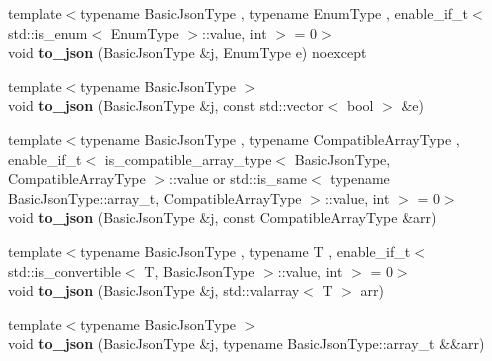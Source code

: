 \begin{DoxyCompactItemize}
\item 
\mbox{\label{namespacenlohmann_1_1detail_a0c8b159dba71981d6c555d284cf6e2bf}} 
{\footnotesize template$<$typename Basic\+Json\+Type , typename Enum\+Type , enable\+\_\+if\+\_\+t$<$ std\+::is\+\_\+enum$<$ Enum\+Type $>$\+::value, int $>$  = 0$>$ }\\void {\bfseries to\+\_\+json} (Basic\+Json\+Type \&j, Enum\+Type e) noexcept
\item 
\mbox{\label{namespacenlohmann_1_1detail_aeca6fb5fede5ed1e12a4420d98a5692b}} 
{\footnotesize template$<$typename Basic\+Json\+Type $>$ }\\void {\bfseries to\+\_\+json} (Basic\+Json\+Type \&j, const std\+::vector$<$ bool $>$ \&e)
\item 
\mbox{\label{namespacenlohmann_1_1detail_a3afebc132c5ff83f9cd160e52030fdfd}} 
{\footnotesize template$<$typename Basic\+Json\+Type , typename Compatible\+Array\+Type , enable\+\_\+if\+\_\+t$<$ is\+\_\+compatible\+\_\+array\+\_\+type$<$ Basic\+Json\+Type, Compatible\+Array\+Type $>$\+::value or std\+::is\+\_\+same$<$ typename Basic\+Json\+Type\+::array\+\_\+t, Compatible\+Array\+Type $>$\+::value, int $>$  = 0$>$ }\\void {\bfseries to\+\_\+json} (Basic\+Json\+Type \&j, const Compatible\+Array\+Type \&arr)
\item 
\mbox{\label{namespacenlohmann_1_1detail_afd18898316e9a20a6458877d2ee27d31}} 
{\footnotesize template$<$typename Basic\+Json\+Type , typename T , enable\+\_\+if\+\_\+t$<$ std\+::is\+\_\+convertible$<$ T, Basic\+Json\+Type $>$\+::value, int $>$  = 0$>$ }\\void {\bfseries to\+\_\+json} (Basic\+Json\+Type \&j, std\+::valarray$<$ T $>$ arr)
\item 
\mbox{\label{namespacenlohmann_1_1detail_aa0fd1b5788e9ba37e31da43dda738cb5}} 
{\footnotesize template$<$typename Basic\+Json\+Type $>$ }\\void {\bfseries to\+\_\+json} (Basic\+Json\+Type \&j, typename Basic\+Json\+Type\+::array\+\_\+t \&\&arr)
\item 
\mbox{\label{namespacenlohmann_1_1detail_a24c9c12f3839c94e09532f08de85e949}} 

\end{DoxyCompactItemize}

